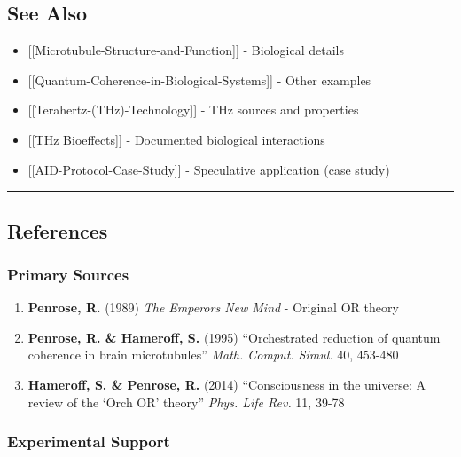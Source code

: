 \subsection{See Also}\label{see-also}

\begin{itemize}
\tightlist
\item
  {[}{[}Microtubule-Structure-and-Function{]}{]} - Biological details
\item
  {[}{[}Quantum-Coherence-in-Biological-Systems{]}{]} - Other examples
\item
  {[}{[}Terahertz-(THz)-Technology{]}{]} - THz sources and properties
\item
  {[}{[}THz Bioeffects{]}{]} - Documented biological interactions
\item
  {[}{[}AID-Protocol-Case-Study{]}{]} - Speculative application (case
  study)
\end{itemize}

\begin{center}\rule{0.5\linewidth}{0.5pt}\end{center}

\subsection{References}\label{references}

\subsubsection{Primary Sources}\label{primary-sources}

\begin{enumerate}
\def\labelenumi{\arabic{enumi}.}
\tightlist
\item
  \textbf{Penrose, R.} (1989) \emph{The Emperor\textquotesingle s New
  Mind} - Original OR theory
\item
  \textbf{Penrose, R. \& Hameroff, S.} (1995) ``Orchestrated reduction
  of quantum coherence in brain microtubules'' \emph{Math. Comput.
  Simul.} 40, 453-480
\item
  \textbf{Hameroff, S. \& Penrose, R.} (2014) ``Consciousness in the
  universe: A review of the `Orch OR' theory'' \emph{Phys. Life Rev.}
  11, 39-78
\end{enumerate}

\subsubsection{Experimental Support}\label{experimental-support}

